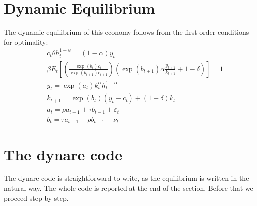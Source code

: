 \documentclass[11pt,a4paper]{article}
\begin{document}
 
\section{Dynamic Equilibrium}
The dynamic equilibrium of this economy follows from the first order conditions for optimality: 
\begin{eqnarray*}
&&c_t \theta h_t^{1+\psi}=(1-\alpha) y_t \\
&&\beta E_t\left[\left(\frac{\exp(b_t) c_t}{\exp(b_{t+1})c_{t+1}}\right)\left(\exp(b_{t+1})\alpha \frac{y_{t+1}}{k_{t+1}}+1-\delta\right)\right]=1\\
&&y_t=\exp(a_t) k_t^\alpha h_t^{1-\alpha} \\
&&k_{t+1}=\exp(b_t)(y_t-c_t)+(1-\delta)k_t \\
&&a_t=\rho a_{t-1}+\tau b_{t-1}+\varepsilon_t \\
&&b_t=\tau a_{t-1}+\rho b_{t-1}+\nu_t 
\end{eqnarray*}
\section{The {\sc dynare} code}
The dynare code is straightforward to write, as the equilibrium is written in the natural way. The whole code is reported at the end of the section. Before that we proceed step by step.
\end{document}
